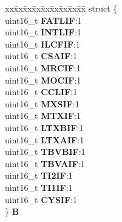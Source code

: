 \begin{DoxyCompactItemize}
\begin{tabbing}
\end{tabbing}\item 
\mbox{\label{unionuPIFR0_a5249689be68d59148f508af3de3436fe}} 
\begin{tabbing}
xx\=xx\=xx\=xx\=xx\=xx\=xx\=xx\=xx\=\kill
struct \{\\
\>uint16\_t {\bfseries FATLIF}:1\\
\>uint16\_t {\bfseries INTLIF}:1\\
\>uint16\_t {\bfseries ILCFIF}:1\\
\>uint16\_t {\bfseries CSAIF}:1\\
\>uint16\_t {\bfseries MRCIF}:1\\
\>uint16\_t {\bfseries MOCIF}:1\\
\>uint16\_t {\bfseries CCLIF}:1\\
\>uint16\_t {\bfseries MXSIF}:1\\
\>uint16\_t {\bfseries MTXIF}:1\\
\>uint16\_t {\bfseries LTXBIF}:1\\
\>uint16\_t {\bfseries LTXAIF}:1\\
\>uint16\_t {\bfseries TBVBIF}:1\\
\>uint16\_t {\bfseries TBVAIF}:1\\
\>uint16\_t {\bfseries TI2IF}:1\\
\>uint16\_t {\bfseries TI1IF}:1\\
\>uint16\_t {\bfseries CYSIF}:1\\
\} {\bfseries B}\\


\end{tabbing}
\end{DoxyCompactItemize}
